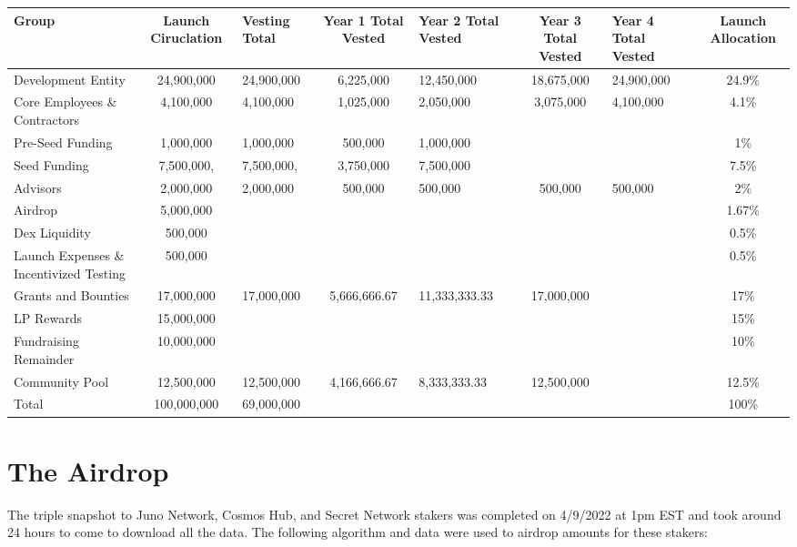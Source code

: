 \documentclass[11pt, nofootinbib]{article}
\begin{document}
\small{
\hspace*{-2.5cm}
\begin{tabular}{| f | C | g | C | g | C | g | C |} 
\hline
{}
\color{White}Group & \color{White}Launch Ciruclation & \color{White}Vesting Total & \color{White}Year 1 Total Vested & \color{White}Year 2 Total Vested & \color{White}Year 3 Total Vested & \color{White}Year 4 Total Vested & \color{White}Launch Allocation \\
\hline
\hline
{} Development Entity & 24,900,000 & 24,900,000 & 6,225,000 & 12,450,000 & 18,675,000 & 24,900,000 & 24.9\% \\
\hline
{}Core Employees \& Contractors & 4,100,000 & 4,100,000 & 1,025,000 & 2,050,000 &  3,075,000 &  4,100,000  & 4.1\% \\
\hline
{}Pre-Seed Funding & 1,000,000 & 1,000,000 & 500,000 & 1,000,000 &  &  & 1\% \\
\hline
{}Seed Funding & 7,500,000, & 7,500,000, & 3,750,000 & 7,500,000 &  &  & 7.5\% \\
\hline
{}Advisors & 2,000,000 & 2,000,000 & 500,000 & 500,000 &500,000&500,000 & 2\% \\
\hline
Airdrop & 5,000,000 &  &  &  &  &  & 1.67\% \\
\hline
Dex Liquidity & 500,000\footnotemark[1] &  &  &  &  &  & 0.5\% \\
\hline
Launch Expenses \& Incentivized Testing & 500,000 &  &  &  &  &  & 0.5\% \\
\hline
Grants and Bounties  & 17,000,000 & 17,000,000 & 5,666,666.67 & 11,333,333.33 & 17,000,000 &  & 17\% \\
\hline
LP Rewards  & 15,000,000 &  &  &  &  &  & 15\% \\
\hline
{}Fundraising Remainder & 10,000,000 &  &  &  &  &  & 10\% \\
\hline
Community Pool & 12,500,000 & 12,500,000 & 4,166,666.67 & 8,333,333.33 & 12,500,000 &  & 12.5\% \\
\hline
{}
Total & 100,000,000 & 69,000,000 &  &  &  &  & 100\% \\
\hline
\end{tabular}
}


\newpage
\section{The Airdrop}
The triple snapshot to Juno Network, Cosmos Hub, and Secret Network stakers was completed on 4/9/2022 at 1pm EST and took around 24 hours to come to download all the data. 
The following algorithm and data were used to airdrop amounts for these stakers:
\end{document}
